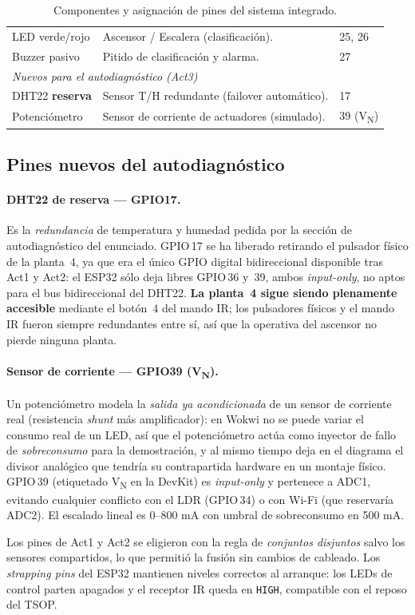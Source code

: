 \begin{table}[H]
\begin{tabular}{p{} p{} p{}}
    LED verde/rojo       & Ascensor / Escalera (clasificación).           & 25, 26 \\
    Buzzer pasivo        & Pitido de clasificación y alarma.              & 27 \\
    \midrule
    \multicolumn{3}{l}{\emph{Nuevos para el autodiagnóstico (Act3)}}\\
    DHT22 \textbf{reserva} & Sensor T/H redundante (failover automático). & 17 \\
    Potenciómetro          & Sensor de corriente de actuadores (simulado).& 39 (V\textsubscript{N}) \\
    \bottomrule
  \end{tabular}
  \caption{Componentes y asignación de pines del sistema integrado.}
  \label{tab:componentes}
\end{table}

\subsection{Pines nuevos del autodiagnóstico}

\paragraph{DHT22 de reserva — GPIO17.}
Es la \emph{redundancia} de temperatura y humedad pedida por la sección de
autodiagnóstico del enunciado. GPIO\,17 se ha liberado retirando el pulsador
físico de la planta~4, ya que era el único GPIO digital bidireccional
disponible tras Act1 y Act2: el ESP32 sólo deja libres GPIO\,36 y~39, ambos
\emph{input-only}, no aptos para el bus bidireccional del DHT22.
\textbf{La planta~4 sigue siendo plenamente accesible} mediante el botón~4
del mando IR; los pulsadores físicos y el mando IR fueron siempre redundantes
entre sí, así que la operativa del ascensor no pierde ninguna planta.

\paragraph{Sensor de corriente — GPIO39 (V\textsubscript{N}).}
Un potenciómetro modela la \emph{salida ya acondicionada} de un sensor de
corriente real (resistencia \emph{shunt} más amplificador): en Wokwi no se
puede variar el consumo real de un LED, así que el potenciómetro actúa como
inyector de fallo de \emph{sobreconsumo} para la demostración, y al mismo
tiempo deja en el diagrama el divisor analógico que tendría su contrapartida
hardware en un montaje físico. GPIO\,39 (etiquetado V\textsubscript{N} en la
DevKit) es \emph{input-only} y pertenece a ADC1, evitando cualquier conflicto
con el LDR (GPIO\,34) o con Wi-Fi (que reservaría ADC2). El escalado lineal
es 0–800 mA con umbral de sobreconsumo en
500 mA.

Los pines de Act1 y Act2 se eligieron con la regla de \emph{conjuntos
disjuntos} salvo los sensores compartidos, lo que permitió la fusión sin
cambios de cableado. Los \emph{strapping pins} del ESP32
\cite{espressif_esp32} mantienen niveles correctos al arranque: los LEDs de
control parten apagados y el receptor IR queda en \texttt{HIGH}, compatible
con el reposo del TSOP.
